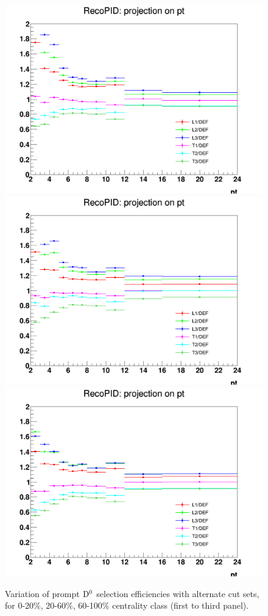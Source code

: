 \begin{figure}
\centering
{\includegraphics[width=0.48\linewidth]{figuresVsCent/Dzero/SystDcuts/CutVarEff_020.png}}
{\includegraphics[width=0.48\linewidth]{figuresVsCent/Dzero/SystDcuts/CutVarEff_2060.png}}
{\includegraphics[width=0.48\linewidth]{figuresVsCent/Dzero/SystDcuts/CutVarEff_60100.png}}
\caption{Variation of prompt ${\rm D^0}$ selection efficiencies with alternate cut sets, for 0-20\%, 20-60\%, 60-100\% centrality class (first to third panel).}
\label{fig:EffVariations}
\end{figure}


